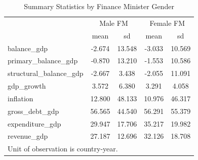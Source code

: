 \begin{table}[htbp]\centering
\def\sym#1{\ifmmode^{#1}\else\(^{#1}\)\fi}
\caption{Summary Statistics by Finance Minister Gender}
\begin{tabular}{l*{2}{cc}}
\hline\hline
            &\multicolumn{2}{c}{Male FM}&\multicolumn{2}{c}{Female FM}\\
            &        mean&          sd&        mean&          sd\\
\hline
balance\_gdp &      -2.674&      13.548&      -3.033&      10.569\\
primary\_balance\_gdp&      -0.870&      13.210&      -1.553&      10.586\\
structural\_balance\_gdp&      -2.667&       3.438&      -2.055&      11.091\\
gdp\_growth  &       3.572&       6.380&       3.291&       4.058\\
inflation   &      12.800&      48.133&      10.976&      46.317\\
gross\_debt\_gdp&      56.565&      44.540&      56.291&      55.379\\
expenditure\_gdp&      29.947&      17.706&      35.217&      19.982\\
revenue\_gdp &      27.187&      12.696&      32.126&      18.708\\
\hline\hline
\multicolumn{5}{l}{\footnotesize Unit of observation is country-year.}\\
\end{tabular}
\end{table}

